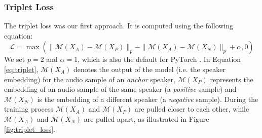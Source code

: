 \subsubsection{Triplet Loss}
The triplet loss \cite{Schroff2015FaceNetAU} was our first approach. It is computed using the following equation:
\begin{equation}
\label{eq:triplet}
\mathcal{L}=\max \left(\|\mathcal{M}(X_A)-\mathcal{M}(X_P)\|_p-\|\mathcal{M}(X_A)-\mathcal{M}(X_N)\|_p+\alpha, 0\right)
\end{equation}
We set $p = 2$ and $\alpha = 1$, which is also the default for PyTorch \cite{paszke2019pytorch, PyTorchTripletMarginLoss}. In Equation \ref{eq:triplet}, $\mathcal{M}(X_A)$ denotes the output of the model (i.e. the speaker embedding) for the audio sample of an \textit{anchor} speaker, $\mathcal{M}(X_P)$ represents the embedding of an audio sample of the same speaker (a \textit{positive} sample) and $\mathcal{M}(X_N)$ is the embedding of a different speaker (a \textit{negative} sample). During the training process $\mathcal{M}(X_A)$ and $\mathcal{M}(X_P)$ are pulled closer to each other, while $\mathcal{M}(X_A)$ and $\mathcal{M}(X_N)$ are pulled apart, as illustrated in Figure \ref{fig:triplet_loss}.

